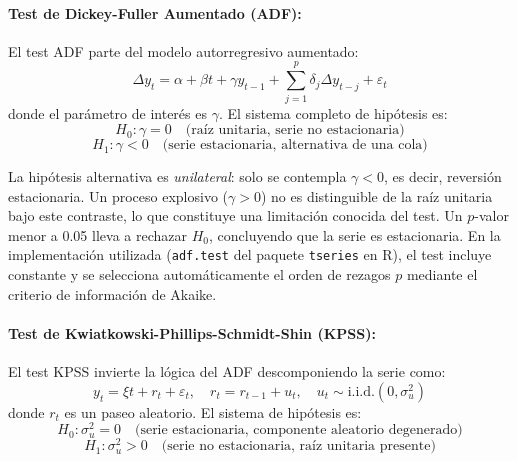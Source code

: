 \paragraph{Test de Dickey-Fuller Aumentado (ADF):}
El test ADF \parencite{DickeyFuller1979} parte del modelo autorregresivo aumentado:
\begin{equation}
\Delta y_t = \alpha + \beta t + \gamma y_{t-1} + \sum_{j=1}^{p} \delta_j \Delta y_{t-j} + \varepsilon_t
\end{equation}
donde el parámetro de interés es $\gamma$. El sistema completo de hipótesis es:
\begin{equation}
H_0: \gamma = 0 \quad \text{(raíz unitaria, serie no estacionaria)}
\end{equation}
\begin{equation}
H_1: \gamma < 0 \quad \text{(serie estacionaria, alternativa de una cola)}
\end{equation}

La hipótesis alternativa es \textit{unilateral}: solo se contempla $\gamma < 0$, es decir, reversión estacionaria. Un proceso explosivo ($\gamma > 0$) no es distinguible de la raíz unitaria bajo este contraste, lo que constituye una limitación conocida del test. Un $p$-valor menor a 0.05 lleva a rechazar $H_0$, concluyendo que la serie es estacionaria. En la implementación utilizada (\texttt{adf.test} del paquete \texttt{tseries} en R), el test incluye constante y se selecciona automáticamente el orden de rezagos $p$ mediante el criterio de información de Akaike.

\paragraph{Test de Kwiatkowski-Phillips-Schmidt-Shin (KPSS):}
El test KPSS \parencite{KPSS1992} invierte la lógica del ADF descomponiendo la serie como:
\begin{equation}
y_t = \xi t + r_t + \varepsilon_t, \quad r_t = r_{t-1} + u_t, \quad u_t \sim \text{i.i.d.}(0, \sigma_u^2)
\end{equation}
donde $r_t$ es un paseo aleatorio. El sistema de hipótesis es:
\begin{equation}
H_0: \sigma_u^2 = 0 \quad \text{(serie estacionaria, componente aleatorio degenerado)}
\end{equation}
\begin{equation}
H_1: \sigma_u^2 > 0 \quad \text{(serie no estacionaria, raíz unitaria presente)}
\end{equation}

